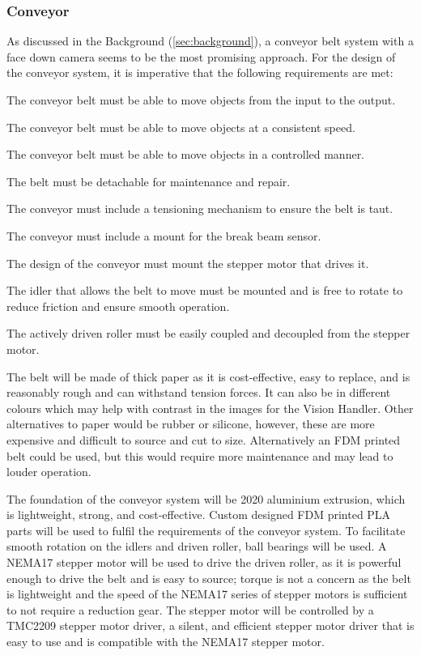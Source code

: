 \subsubsection{Conveyor}
\label{sec:conveyor-design}
As discussed in the Background (\autoref{sec:background}), a conveyor belt system with a face down camera seems to be the most promising approach. For the design of the conveyor system, it is imperative that the following requirements are met:
\begin{mylist}
    \item The conveyor belt must be able to move objects from the input to the output.
    \item The conveyor belt must be able to move objects at a consistent speed.
    \item The conveyor belt must be able to move objects in a controlled manner.
    \item The belt must be detachable for maintenance and repair.
    \item The conveyor must include a tensioning mechanism to ensure the belt is taut.
    \item The conveyor must include a mount for the break beam sensor.
    \item The design of the conveyor must mount the stepper motor that drives it.
    \item The idler that allows the belt to move must be mounted and is free to rotate to reduce friction and ensure smooth operation.
    \item The actively driven roller must be easily coupled and decoupled from the stepper motor.
\end{mylist}

The belt will be made of thick paper as it is cost-effective, easy to replace, and is reasonably rough and can withstand tension forces. It can also be in different colours which may help with contrast in the images for the Vision Handler. Other alternatives to paper would be rubber or silicone, however, these are more expensive and difficult to source and cut to size. Alternatively an FDM printed belt could be used, but this would require more maintenance and may lead to louder operation.

The foundation of the conveyor system will be 2020 aluminium extrusion, which is lightweight, strong, and cost-effective. Custom designed FDM printed PLA parts will be used to fulfil the requirements of the conveyor system. To facilitate smooth rotation on the idlers and driven roller, ball bearings will be used. A NEMA17 stepper motor will be used to drive the driven roller, as it is powerful enough to drive the belt and is easy to source; torque is not a concern as the belt is lightweight and the speed of the NEMA17 series of stepper motors is sufficient to not require a reduction gear. The stepper motor will be controlled by a TMC2209 stepper motor driver, a silent, and efficient stepper motor driver that is easy to use and is compatible with the NEMA17 stepper motor.

